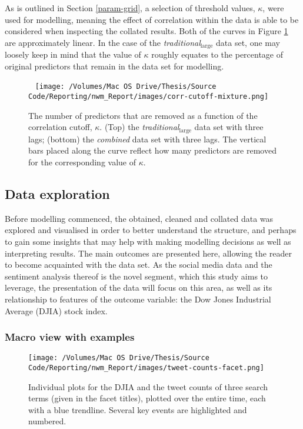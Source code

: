 \documentclass{article}
\begin{document}
As is outlined in Section \ref{param-grid}, a selection of threshold values, $\kappa$, were used for modelling, meaning the effect of correlation within the data is able to be considered when inspecting the collated results. Both of the curves in Figure \ref{fig:corr-cutoff} are approximately linear. In the case of the \emph{traditional$_{\text{large}}$} data set, one may loosely keep in mind that the value of $\kappa$ roughly equates to the percentage of original predictors that remain in the data set for modelling.

\begin{figure}\
\centering
\texttt{[image: /Volumes/Mac OS Drive/Thesis/Source Code/Reporting/nwm\_Report/images/corr-cutoff-mixture.png]}
\caption[The number of predictors removed as a function of the correlation threshold, $\kappa$]{\label{fig:corr-cutoff}The number of predictors that are removed as a function of the correlation cutoff, $\kappa$. (Top) the \emph{traditional$_{\text{large}}$} data set with three lags; (bottom) the \emph{combined} data set with three lags. The vertical bars placed along the curve reflect how many predictors are removed for the corresponding value of $\kappa$.}
\end{figure}


\pagebreak


\subsection{Data exploration \label{data-exploration}}
\label{sec-6-3}

Before modelling commenced, the obtained, cleaned and collated data was explored and visualised in order to better understand the structure, and perhaps to gain some insights that may help with making modelling decisions as well as interpreting results. The main outcomes are presented here, allowing the reader to become acquainted with the data set. As the social media data and the sentiment analysis thereof is the novel segment, which this study aims to leverage, the presentation of the data will focus on this area, as well as its relationship to features of the outcome variable: the Dow Jones Industrial Average (DJIA) stock index.


\subsubsection{Macro view with examples \label{macro-view}}
\label{sec-6-3-1}

\begin{wrapfigure}{l}{0.5\textwidth}
\centering
\texttt{[image: /Volumes/Mac OS Drive/Thesis/Source Code/Reporting/nwm\_Report/images/tweet-counts-facet.png]}
\caption[Movements of the DJIA compared to Twitter activity]{\label{fig:tweet-counts-facet}Individual plots for the DJIA and the tweet counts of three search terms (given in the facet titles), plotted over the entire time, each with a blue trendline. Several key events are highlighted and numbered.}
\end{wrapfigure}
\end{document}
